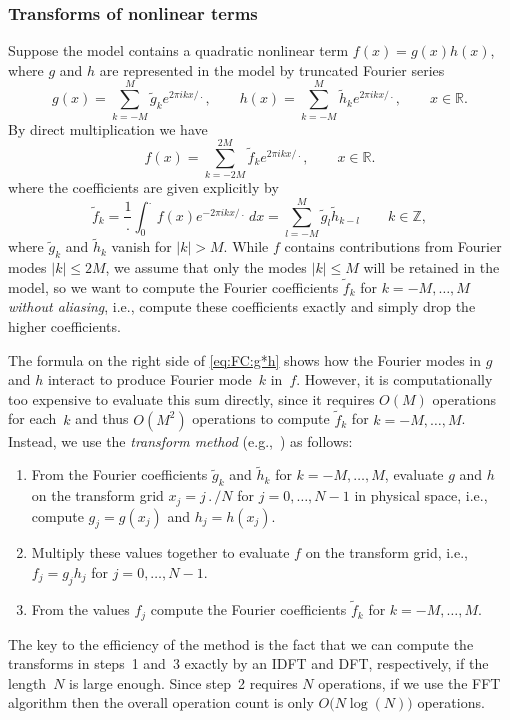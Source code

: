 \documentclass[12pt]{article}
\newcommand{\R}{\mathbb{R}}
\newcommand{\Z}{\mathbb{Z}}
\newcommand{\abs}[1]{\left|{#1}\right|}
\newcommand{\fc}[1]{\widetilde{#1}} %
\begin{document}
\pagebreak[1]
\subsubsection{Transforms of nonlinear terms}

Suppose the model contains a quadratic nonlinear term $f(x)=g(x)h(x)$, 
where $g$ and $h$ are represented in the model by truncated Fourier series
\begin{equation}
   g(x) = \sum_{k=-M}^{M} \fc{g}_k e^{2\pi ikx/\period},
\qquad
   h(x) = \sum_{k=-M}^{M} \fc{h}_k e^{2\pi ikx/\period},
\qquad x\in\R.
\label{eq:FS:g,h}
\end{equation}
By direct multiplication we have
\begin{equation}
   f(x) = \sum_{k=-2M}^{2M} \fc{f}_k e^{2\pi ikx/\period},
\qquad x\in\R.
\label{eq:FS:g*h}
\end{equation}
where the coefficients are given explicitly by
\begin{equation}
   \fc{f}_k = \frac{1}{\period}\int_{0}^{\period} f(x) 
              e^{-2\pi ikx/\period} \,dx 
            = \sum_{l=-M}^{M} \fc{g}_l \fc{h}_{k-l}
\qquad k\in\Z,
\label{eq:FC:g*h}
\end{equation}
where $\fc{g}_k$ and $\fc{h}_k$ vanish for $\abs{k}>M$.  While $f$ contains
contributions from Fourier modes $\abs{k}\le 2M$, we assume that only the
modes $\abs{k}\le M$ will be retained in the model, so we want to compute the
Fourier coefficients $\fc{f}_k$ for $k=-M,\dots,M$ \emph{without aliasing},
i.e., compute these coefficients exactly and simply drop the higher
coefficients.

The formula on the right side of \eqref{eq:FC:g*h} shows how the Fourier modes
in $g$ and $h$ interact to produce Fourier mode~$k$ in~$f$.  However, it is
computationally too expensive to evaluate this sum directly, since it requires
$O(M)$ operations for each~$k$ and thus $O(M^2)$ operations to compute
$\fc{f}_k$ for $k=-M,\dots,M$.  Instead, we use the \emph{transform method}
(e.g.,~\cite{Orszag70}) as follows:
\begin{enumerate}
\item From the Fourier coefficients $\fc{g}_k$ and $\fc{h}_k$ for 
$k=-M,\dots,M$, evaluate $g$ and $h$ on the transform grid $x_j=j\period/N$
for $j=0,\dots,N-1$ in physical space, i.e., compute $g_j=g(x_j)$ and
$h_j=h(x_j)$.
\item Multiply these values together to evaluate $f$ on the transform grid,
i.e., $f_j=g_j h_j$ for $j=0,\dots,N-1$.
\item From the values $f_j$ compute the Fourier coefficients 
$\fc{f}_k$ for $k=-M,\dots,M$.
\end{enumerate}
The key to the efficiency of the method is the fact that we can compute the
transforms in steps~1 and~3 exactly by an IDFT and DFT, respectively, if the
length~$N$ is large enough.  Since step~2 requires $N$ operations, if we use
the FFT algorithm then the overall operation count is only
$O\big(N\log(N)\big)$ operations.
\end{document}
